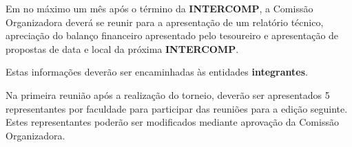 \begin{article}
	Em no máximo um mês após o término da \textbf{INTERCOMP}, a Comissão Organizadora deverá se reunir para a apresentação de um relatório técnico, apreciação do balanço financeiro apresentado pelo tesoureiro e apresentação de propostas de data e local da próxima \textbf{INTERCOMP}.

	\begin{xparagraph}
		Estas informações deverão ser encaminhadas às entidades \textbf{integrantes}.
	\end{xparagraph}

	\begin{xparagraph}
		Na primeira reunião após a realização do torneio, deverão ser apresentados 5 representantes por faculdade para participar das reuniões para a edição seguinte. Estes representantes poderão ser modificados mediante aprovação da Comissão Organizadora.
	\end{xparagraph}
\end{article}
